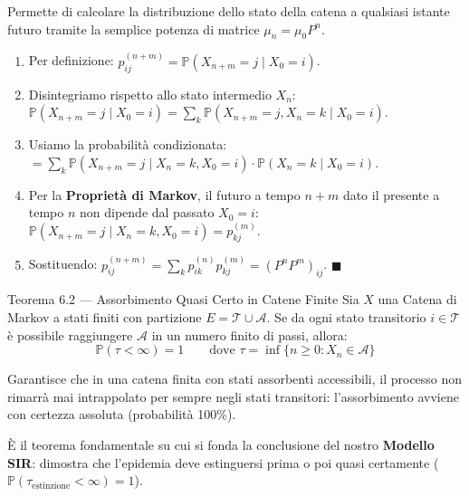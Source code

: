 \documentclass[11pt,a4paper]{report}
\newcommand{\PP}{\mathbb{P}}
\newcommand{\1}{\mathbf{1}}
\begin{document}
\begin{acosaserve}
Permette di calcolare la distribuzione dello stato della catena a qualsiasi istante futuro tramite la semplice potenza di matrice $\mu_n = \mu_0 P^n$.
\end{acosaserve}

\begin{dimostrazione}
\begin{enumerate}
    \item Per definizione: $p_{ij}^{(n+m)} = \PP(X_{n+m} = j \mid X_0 = i)$.
    \item Disintegriamo rispetto allo stato intermedio $X_n$: $\PP(X_{n+m} = j \mid X_0 = i) = \sum_{k} \PP(X_{n+m} = j, X_n = k \mid X_0 = i)$.
    \item Usiamo la probabilità condizionata: $= \sum_{k} \PP(X_{n+m} = j \mid X_n = k, X_0 = i) \cdot \PP(X_n = k \mid X_0 = i)$.
    \item Per la \textbf{Proprietà di Markov}, il futuro a tempo $n+m$ dato il presente a tempo $n$ non dipende dal passato $X_0 = i$: $\PP(X_{n+m} = j \mid X_n = k, X_0 = i) = p_{kj}^{(m)}$.
    \item Sostituendo: $p_{ij}^{(n+m)} = \sum_{k} p_{ik}^{(n)} p_{kj}^{(m)} = (P^n P^m)_{ij}$. $\blacksquare$
\end{enumerate}
\end{dimostrazione}

\vspace{0.4cm}

\begin{teoremabox}{Teorema 6.2 --- Assorbimento Quasi Certo in Catene Finite}
Sia $X$ una Catena di Markov a stati finiti con partizione $E = \mathcal{T} \cup \mathcal{A}$. Se da ogni stato transitorio $i \in \mathcal{T}$ è possibile raggiungere $\mathcal{A}$ in un numero finito di passi, allora:
\[ \PP(\tau < \infty) = 1 \qquad \text{dove } \tau = \inf\{n \ge 0 : X_n \in \mathcal{A}\} \]
\end{teoremabox}

\begin{cosafa}
Garantisce che in una catena finita con stati assorbenti accessibili, il processo non rimarrà mai intrappolato per sempre negli stati transitori: l'assorbimento avviene con certezza assoluta (probabilità 100\%).
\end{cosafa}

\begin{acosaserve}
È il teorema fondamentale su cui si fonda la conclusione del nostro \textbf{Modello SIR}: dimostra che l'epidemia deve estinguersi prima o poi quasi certamente ($\PP(\tau_{\text{estinzione}} < \infty) = 1$).
\end{acosaserve}
\end{document}
